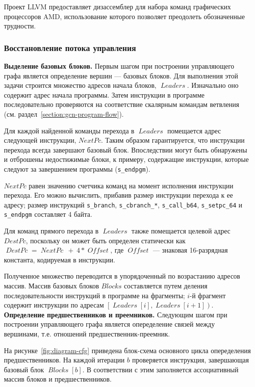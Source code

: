 \documentclass[a4paper,14pt]{extarticle}
\newcommand{\topic}[1]{\textbf{#1.}}
\newcommand{\var}[1]{\mathop{\mathit{#1}}}
\begin{document}
{Проект LLVM предоставляет дизассемблер для набора команд графических процессоров AMD,
использование которого позволяет преодолеть обозначенные трудности.

\subsubsection{Восстановление потока управления}

\topic{Выделение базовых блоков} Первым шагом при построении управляющего графа
является определение вершин — базовых блоков. Для выполнения этой задачи
строится множество адресов начала блоков, $\var{Leaders}$. Изначально
оно содержит адрес начала программы. Затем инструкции в программе
последовательно проверяются на соответствие скалярным командам ветвления
(см. раздел~\ref{section:gcn-program-flow}).

Для каждой найденной команды перехода в $\var{Leaders}$ помещается адрес следующей инструкции,
$NextPc$. Таким образом гарантируется, что инструкции перехода всегда завершают базовый
блок. Впоследствии могут быть обнаружены и отброшены недостижимые блоки, к примеру,
содержащие инструкции, которые следуют за завершением программы (\verb|s_endpgm|).

$NextPc$ равен значению счетчика команд на момент исполнения инструкции перехода.
Его можно вычислить, прибавив размер инструкции перехода к ее адресу; размер инструкций
\verb|s_branch|, \verb|s_cbranch_*|, \verb|s_call_b64|, \verb|s_setpc_64|
и \verb|s_endpgm| составляет 4 байта.

Для команд прямого перехода в $\var{Leaders}$ также помещается целевой адрес $DestPc$,
поскольку он может быть определен статически как $\var{DestPc} = \var{NextPc}\ +\ 4*\var{Offset}$,
где $\var{Offset}$ — знаковая 16-разрядная константа, кодируемая в инструкции.

Полученное множество переводится в упорядоченный по возрастанию адресов массив.
Массив базовых блоков $Blocks$ составляется путем деления последовательности инструкций
в программе на фрагменты; $i$-й фрагмент содержит инструкции по адресам
$\left[\var{Leaders}[i], \var{Leaders}[i+1]\right)$.\\

\topic{Определение предшественников и преемников} Следующим шагом при построении
управляющего графа является опеределение связей между вершинами, т.е. отношений
предшественник-преемник.

На рисунке~\ref{fig:diagram-cfg} приведена блок-схема основного цикла
опеределения предшественников. На каждой итерации $b$ проверяется инструкция, завершающая
базовый блок $\var{Blocks}[b]$. В соответствии с этим заполняется ассоциативный массив
блоков и предшественников.

}
\end{document}
